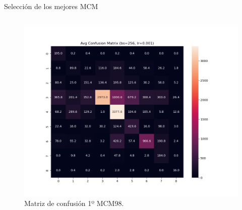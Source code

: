 \begin{frame}{Selección de los mejores MCM}
\begin{columns}[b]
\begin{column}{0.3\textwidth}
\begin{figure}[H]
    \centering
    \includegraphics[width=1\textwidth]{../Memoria/img/modelo/matrices_confusion/MC_ENT_MCM98.png}
    \caption{Matriz de confusión 1º MCM98.}
    \label{fig:MC_ENT_MCM98}
\end{figure}

\end{column}
\end{columns}
\end{frame}


